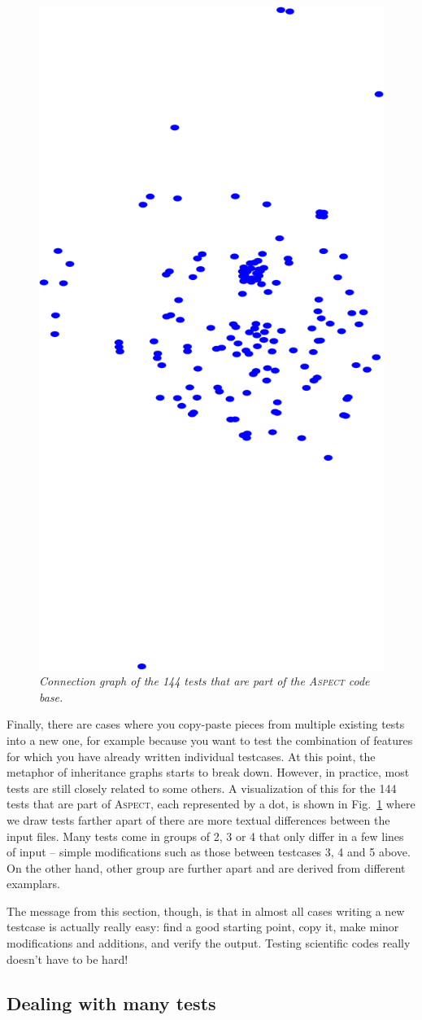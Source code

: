 \documentclass{article}
\newcommand{\aspect}{\textsc{Aspect}}
\begin{document}
\begin{figure}
  \begin{center}
    \vspace*{-24pt}
    \includegraphics[height=0.45\textwidth,angle=-90]{figures/graph.png}
    \vspace*{-12pt}
  \end{center}
  \caption{\it Connection graph of the 144 tests that are part of the
    \aspect{} code base.}
  \vspace*{-3mm}
  \label{fig:aspect-tests}
\end{figure}
Finally, there are cases where you copy-paste pieces from multiple existing
tests into a new one, for example because you want to test the combination of
features for which you have already written individual testcases. At this
point, the metaphor of inheritance graphs starts to break down. However, in
practice, most tests are still closely related to some others. A visualization
of this for the 144 tests that are part of \aspect{}, each represented by a
dot, is shown in Fig.~\ref{fig:aspect-tests} where we draw tests farther apart
of there are more textual differences between the input files. Many tests come
in groups of 2, 3 or 4 that only differ in a few lines of input -- simple
modifications such as those between testcases 3, 4 and 5 above. On the other
hand, other group are further apart and are derived from different
examplars.

The message from this section, though, is that in almost all cases writing a
new testcase is actually really easy: find a good starting point, copy it,
make minor modifications and additions, and verify the output. Testing
scientific codes really doesn't have to be hard!

\subsection{Dealing with many tests}
\label{sec:many-tests}
\end{document}
